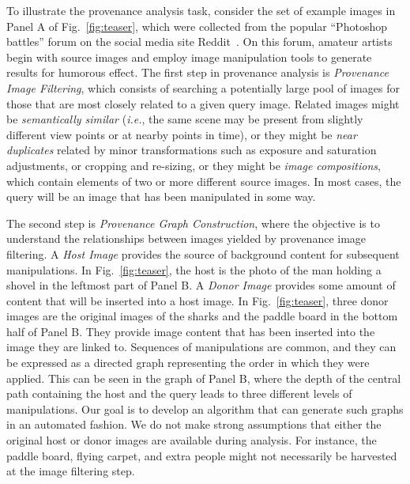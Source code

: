 To illustrate the provenance analysis task, consider the set of example images in Panel A of Fig.~\ref{fig:teaser}, which were collected from the popular ``Photoshop battles'' forum on the social media site Reddit~\cite{reddit2017photoshopbattles}.
On this forum, amateur artists begin with source images and employ image manipulation tools to generate results for humorous effect.
The first step in provenance analysis is \textit{Provenance Image Filtering}, which consists of searching a potentially large pool of images for those that are most closely related to a given query image.
Related images might be {\em semantically similar} ({\em i.e.}, the same scene may be present from slightly different view points or at nearby points in time), or they might be {\em near duplicates} related by minor transformations such as exposure and saturation adjustments, or cropping and re-sizing, or they might be {\em  image compositions}, which contain elements of two or more different source images.
In most cases, the query will be an image that has been manipulated in some way. 

The second step is \textit{Provenance Graph Construction}, where the objective is to understand the relationships between images yielded by provenance image filtering.
A \textit{Host Image} provides the source of background content for subsequent manipulations.
In Fig.~\ref{fig:teaser}, the host is the photo of the man holding a shovel in the 
leftmost part of Panel B. %
A \textit{Donor Image} provides some amount of content that will be inserted into a host image.
In Fig.~\ref{fig:teaser}, three donor images are the original images of the sharks and the paddle board in the %
bottom half of Panel B.
They provide image content that has been inserted into the image %
they are linked to.
Sequences of manipulations are common, and they can be expressed as a directed graph representing the order in which they were applied.
This can be seen in the %
graph of Panel B, where the depth %
of the central path containing the host and the query 
leads to three different levels of manipulations.
Our goal %
is to develop an algorithm that can generate such graphs in an automated fashion.
We do not make strong assumptions that either the original host or donor images are available during analysis. %
For instance, the paddle board, flying carpet, and extra people might not necessarily be harvested at the image filtering step.

